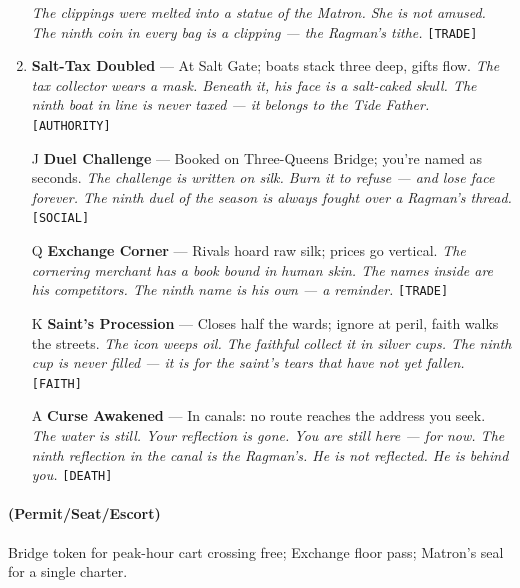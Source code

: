 \begin{enumerate}
  \hfill \textit{The clippings were melted into a statue of the Matron. She is not amused. The ninth coin in every bag is a clipping --- the Ragman's tithe.} \texttt{[TRADE]}
\item \textbf{Salt-Tax Doubled} --- At Salt Gate; boats stack three deep, gifts flow.
  \hfill \textit{The tax collector wears a mask. Beneath it, his face is a salt-caked skull. The ninth boat in line is never taxed --- it belongs to the Tide Father.} \texttt{[AUTHORITY]}
\item[J] \textbf{Duel Challenge} --- Booked on Three-Queens Bridge; you're named as seconds.
  \hfill \textit{The challenge is written on silk. Burn it to refuse --- and lose face forever. The ninth duel of the season is always fought over a Ragman's thread.} \texttt{[SOCIAL]}
\item[Q] \textbf{Exchange Corner} --- Rivals hoard raw silk; prices go vertical.
  \hfill \textit{The cornering merchant has a book bound in human skin. The names inside are his competitors. The ninth name is his own --- a reminder.} \texttt{[TRADE]}
\item[K] \textbf{Saint's Procession} --- Closes half the wards; ignore at peril, faith walks the streets.
  \hfill \textit{The icon weeps oil. The faithful collect it in silver cups. The ninth cup is never filled --- it is for the saint's tears that have not yet fallen.} \texttt{[FAITH]}
\item[A] \textbf{Curse Awakened} --- In canals: no route reaches the address you seek.
  \hfill \textit{The water is still. Your reflection is gone. You are still here --- for now. The ninth reflection in the canal is the Ragman's. He is not reflected. He is behind you.} \texttt{[DEATH]}
\end{enumerate}

\paragraph*{(Permit/Seat/Escort)} Bridge token for peak-hour cart crossing free; Exchange floor pass; Matron's seal for a single charter.

